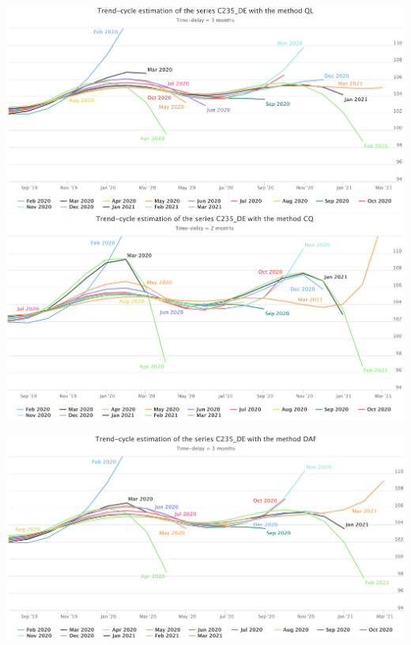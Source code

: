 \documentclass[10pt,xcolor=table,color={dvipsnames,usenames},ignorenonframetext,usepdftitle=false,english]{beamer}
\newcommand\1{\mathds{1}}
\begin{document}
\begin{frame}{}
\protect\hypertarget{section-4}{}
\centering

\includegraphics[height = 0.5\paperheight]{img/C235DE_ql}
\includegraphics[height = 0.5\paperheight]{img/C235DE_cq}
\end{frame}

\begin{frame}{}
\protect\hypertarget{section-5}{}
\centering

\includegraphics[height = 0.5\paperheight]{img/C235DE_daf}
\end{frame}
\end{document}
